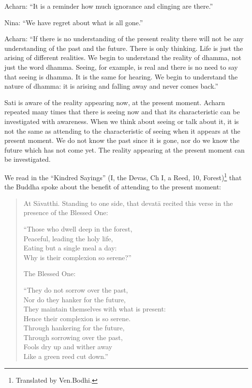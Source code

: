 Acharn: ``It is a reminder how much ignorance and clinging are there.''

Nina: ``We have regret about what is all gone.''

Acharn: ``If there is no understanding of the present reality there will
not be any understanding of the past and the future. There is only
thinking. Life is just the arising of different realities. We begin to
understand the reality of dhamma, not just the word dhamma. Seeing, for
example, is real and there is no need to say that seeing is dhamma. It
is the same for hearing. We begin to understand the nature of dhamma: it
is arising and falling away and never comes back.''

Sati is aware of the reality appearing now, at the present moment.
Acharn repeated many times that there is seeing now and that its
characteristic can be investigated with awareness. When we think about
seeing or talk about it, it is not the same as attending to the
characteristic of seeing when it appears at the present moment. We do
not know the past since it is gone, nor do we know the future which has
not come yet. The reality appearing at the present moment can be
investigated.

We read in the ``Kindred Sayings'' (I, the Devas, Ch I, a Reed, 10,
Forest)\footnote{Translated by Ven.Bodhi.} that the Buddha
spoke about the benefit of attending to the present moment:

\begin{verse}
At Sāvatthi. Standing to one side, that devatā recited this verse in the presence of the Blessed One:

``Those who dwell deep in the forest,\\

Peaceful, leading the holy life,\\

Eating but a single meal a day:\\

Why is their complexion so serene?''

The Blessed One:

``They do not sorrow over the past,\\

Nor do they hanker for the future,\\

They maintain themselves with what is present:\\

Hence their complexion is so serene.\\

Through hankering for the future,\\

Through sorrowing over the past,\\

Fools dry up and wither away\\

Like a green reed cut down.''
\end{verse}



